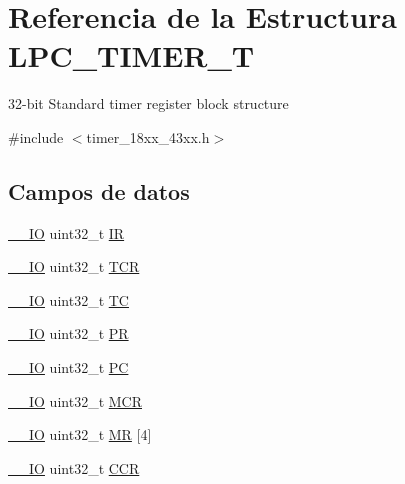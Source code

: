\hypertarget{struct_l_p_c___t_i_m_e_r___t}{}\section{Referencia de la Estructura L\+P\+C\+\_\+\+T\+I\+M\+E\+R\+\_\+T}
\label{struct_l_p_c___t_i_m_e_r___t}


32-\/bit Standard timer register block structure  




{\ttfamily \#include $<$timer\+\_\+18xx\+\_\+43xx.\+h$>$}

\subsection*{Campos de datos}
\begin{DoxyCompactItemize}
\item 
\hyperlink{core__sc300_8h_aec43007d9998a0a0e01faede4133d6be}{\+\_\+\+\_\+\+IO} uint32\+\_\+t \hyperlink{struct_l_p_c___t_i_m_e_r___t_a6615bc39cfcd7131bdc8662583cc6714}{IR}
\item 
\hyperlink{core__sc300_8h_aec43007d9998a0a0e01faede4133d6be}{\+\_\+\+\_\+\+IO} uint32\+\_\+t \hyperlink{struct_l_p_c___t_i_m_e_r___t_ae9dd9282fab299d0cd6e119564688e53}{T\+CR}
\item 
\hyperlink{core__sc300_8h_aec43007d9998a0a0e01faede4133d6be}{\+\_\+\+\_\+\+IO} uint32\+\_\+t \hyperlink{struct_l_p_c___t_i_m_e_r___t_abb0bc781f4dc091c913978e313c03d25}{TC}
\item 
\hyperlink{core__sc300_8h_aec43007d9998a0a0e01faede4133d6be}{\+\_\+\+\_\+\+IO} uint32\+\_\+t \hyperlink{struct_l_p_c___t_i_m_e_r___t_af8d25514079514d38c104402f46470af}{PR}
\item 
\hyperlink{core__sc300_8h_aec43007d9998a0a0e01faede4133d6be}{\+\_\+\+\_\+\+IO} uint32\+\_\+t \hyperlink{struct_l_p_c___t_i_m_e_r___t_a84724e7860a32fe120a1627483dfa5c5}{PC}
\item 
\hyperlink{core__sc300_8h_aec43007d9998a0a0e01faede4133d6be}{\+\_\+\+\_\+\+IO} uint32\+\_\+t \hyperlink{struct_l_p_c___t_i_m_e_r___t_a27af4e9f888f0b7b1e8da7e002d98798}{M\+CR}
\item 
\hyperlink{core__sc300_8h_aec43007d9998a0a0e01faede4133d6be}{\+\_\+\+\_\+\+IO} uint32\+\_\+t \hyperlink{struct_l_p_c___t_i_m_e_r___t_a3cf8dd14680194ee82a55d1cf9dd299c}{MR} \mbox{[}4\mbox{]}
\item 
\hyperlink{core__sc300_8h_aec43007d9998a0a0e01faede4133d6be}{\+\_\+\+\_\+\+IO} uint32\+\_\+t \hyperlink{struct_l_p_c___t_i_m_e_r___t_a5e1322e27c40bf91d172f9673f205c97}{C\+CR}

\end{DoxyCompactItemize}
